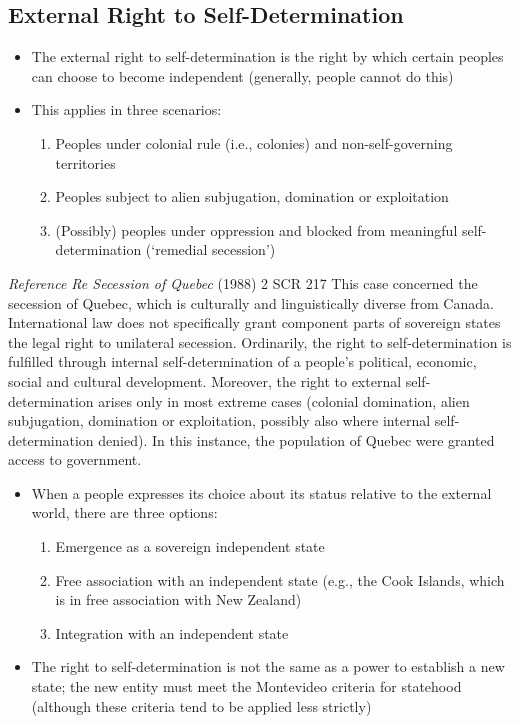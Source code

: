 \subsection{External Right to Self-Determination}
\begin{itemize}
    \item The external right to self-determination is the right by which certain peoples can choose to become independent (generally, people cannot do this)
    \item This applies in three scenarios:
    \begin{enumerate}
        \item Peoples under colonial rule (i.e., colonies) and non-self-governing territories
        \item Peoples subject to alien subjugation, domination or exploitation
        \item (Possibly) peoples under oppression and blocked from meaningful self-determination (`remedial secession')
    \end{enumerate}
\end{itemize}

\begin{casedetails}{\textit{Reference Re Secession of Quebec} (1988) 2 SCR 217}
    \flushleft
    This case concerned the secession of Quebec, which is culturally and linguistically diverse from Canada. International law does not specifically grant component parts of sovereign states the legal right to unilateral secession. Ordinarily, the right to self-determination is fulfilled through internal self-determination of a people's political, economic, social and cultural development. Moreover, the right to external self-determination arises only in most extreme cases (colonial domination, alien subjugation, domination or exploitation, possibly also where internal self-determination denied). In this instance, the population of Quebec were granted access to government.
\end{casedetails}

\begin{itemize}
    \item When a people expresses its choice about its status relative to the external world, there are three options:
    \begin{enumerate}
        \item Emergence as a sovereign independent state
        \item Free association with an independent state (e.g., the Cook Islands, which is in free association with New Zealand)
        \item Integration with an independent state
    \end{enumerate}
    \item The right to self-determination is not the same as a power to establish a new state; the new entity must meet the Montevideo criteria for statehood (although these criteria tend to be applied less strictly)
\end{itemize}

